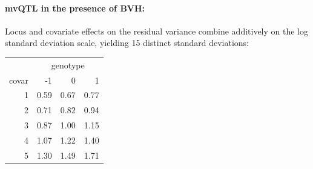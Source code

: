     \paragraph{mvQTL in the presence of BVH:}
        Locus and covariate effects on the residual variance combine additively on the log standard deviation scale, yielding 15 distinct standard deviations:
        \begin{table}[ht]
        \centering
        \begin{tabular}{rrrr}
            \hline
            & \multicolumn{3}{c}{genotype}\\
            \cmidrule{2-4}
            covar & -1 & 0 & 1 \\
            \hline
            1 & 0.59 & 0.67 & 0.77 \\
            2 & 0.71 & 0.82 & 0.94 \\
            3 & 0.87 & 1.00 & 1.15 \\
            4 & 1.07 & 1.22 & 1.40 \\
            5 & 1.30 & 1.49 & 1.71 \\
            \hline
        \end{tabular}
        \end{table}

\FloatBarrier
\clearpage
